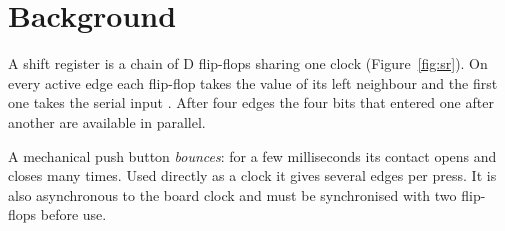\section{Background}
A shift register is a chain of D flip-flops sharing one clock (Figure~\ref{fig:sr}). On every active
edge each flip-flop takes the value of its left neighbour and the first one takes the serial input
\cite{harris}. After four edges the four bits that entered one after another are available in parallel.


A mechanical push button \emph{bounces}: for a few milliseconds its contact opens and closes many
times. Used directly as a clock it gives several edges per press. It is also asynchronous to the board
clock and must be synchronised with two flip-flops before use.
